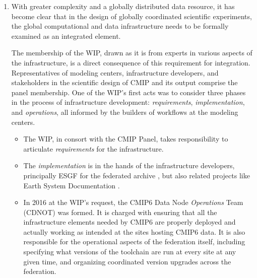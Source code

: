 \documentclass[gmd,manuscript]{copernicus}
\newcommand{\pllabel}[1]{\label{p-#1}\linelabel{l-#1}}
\newcommand{\urlref}[2] {\href{#1}{#2}\footnote{\url{#1}, retrieved \today.}}
\begin{document}
\begin{enumerate}
\item With greater complexity and a globally distributed data
  resource, it has become clear that in the design of globally
  coordinated scientific experiments, the global computational and
  data infrastructure needs to be formally examined as an integrated
  element.
  
  The membership of the WIP, drawn as it is from experts in various
  aspects of the infrastructure, is a direct consequence of this
  requirement for integration. Representatives of modeling centers,
  infrastructure developers, and stakeholders in the scientific design
  of CMIP and its output comprise the panel membership. One of the
  WIP's first acts was to consider three phases in the process of
  infrastructure development: \emph{requirements},
  \emph{implementation}, and \emph{operations}, all informed by the
  builders of workflows at the modeling centers.
    
  \begin{itemize}
  \item The WIP, in consort with the CMIP Panel, takes responsibility
    to articulate \emph{requirements} for the infrastructure.
  \item The \emph{implementation} is in the hands of the
    infrastructure developers, principally ESGF for the federated
    archive \citep{ref:williamsetal2015}, but also related projects
    like Earth System Documentation
    \citep[\urlref{https://goo.gl/WNwKD9}{ES-DOC},][]{ref:guilyardietal2013}.
  \item In 2016 at the WIP's request, the CMIP6 Data Node
    \emph{Operations} Team (CDNOT) was formed.
    \pllabel{RC3-22}
    It is charged with ensuring that all the infrastructure elements
    needed by CMIP6 are properly deployed and actually working as
    intended at the sites hosting CMIP6 data. It is also responsible
    for the operational aspects of the federation itself, including
    specifying what versions of the toolchain are run at every site at
    any given time, and organizing coordinated version upgrades across
    the federation.
  \end{itemize}


\end{enumerate}
\end{document}
